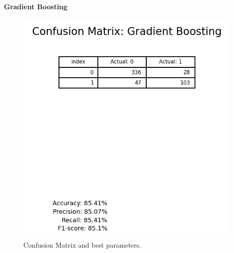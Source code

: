             \paragraph{Gradient Boosting}
                \begin{figure}[H]
                        \centering
                        \includegraphics[scale=1]{images/dm_confu_mat_grad_boos}
                        \caption{Confusion Matrix and best parameters.}
                        \label{fig:dm-gradient-booting}
                \end{figure}
